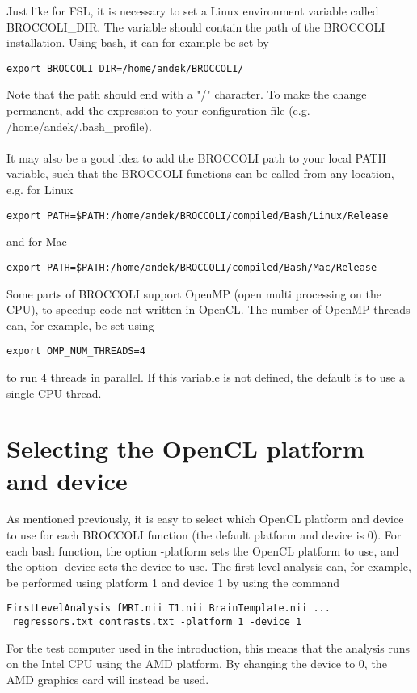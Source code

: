 Just like for FSL, it is necessary to set a Linux environment variable called BROCCOLI\_DIR. The variable should contain the path of the BROCCOLI installation. Using bash, it can for example be set by

\begin{verbatim}
export BROCCOLI_DIR=/home/andek/BROCCOLI/
\end{verbatim}
Note that the path should end with a "/" character. To make the change permanent, add the expression to your configuration file (e.g. /home/andek/.bash\_profile). \\ \\ It may also be a good idea to add the BROCCOLI path to your local PATH variable, such that the BROCCOLI functions can be called from any location, e.g. for Linux

\begin{verbatim}
export PATH=$PATH:/home/andek/BROCCOLI/compiled/Bash/Linux/Release
\end{verbatim}
and for Mac

\begin{verbatim}
export PATH=$PATH:/home/andek/BROCCOLI/compiled/Bash/Mac/Release
\end{verbatim}
Some parts of BROCCOLI support OpenMP (open multi processing on the CPU), to speedup code not written in OpenCL. The number of OpenMP threads can, for example, be set using

\begin{verbatim}
export OMP_NUM_THREADS=4
\end{verbatim}
to run 4 threads in parallel. If this variable is not defined, the default is to use a single CPU thread.

\section{Selecting the OpenCL platform and device}

As mentioned previously, it is easy to select which OpenCL platform and device to use for each BROCCOLI function (the default platform and device is 0). For each bash function, the option -platform sets the OpenCL platform to use, and the option -device sets the device to use. The first level analysis can, for example, be performed using platform 1 and device 1 by using the command

\begin{verbatim}
FirstLevelAnalysis fMRI.nii T1.nii BrainTemplate.nii ...
 regressors.txt contrasts.txt -platform 1 -device 1
\end{verbatim}
For the test computer used in the introduction, this means that the analysis runs on the Intel CPU using the AMD platform. By changing the device to 0, the AMD graphics card will instead be used. 

